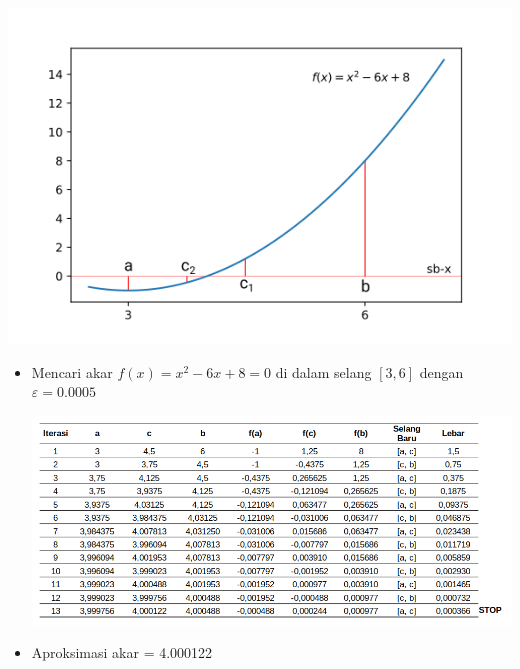 \documentclass[pdflatex,compress]{beamer}
\begin{document}
\begin{frame}
	\begin{center}
		\includegraphics[width=\linewidth]{img/img002}
	\end{center}
\end{frame}

\begin{frame}
	\begin{itemize}
		\item Mencari akar $ f(x) = x^2 - 6x + 8 = 0 $ di dalam selang $ [3, 6] $ dengan $ \varepsilon = 0.0005 $
		
		\begin{center}
			\includegraphics[width=\linewidth]{img/tab001}
		\end{center}
	
		\item Aproksimasi akar = 4.000122
	\end{itemize}
\end{frame}
\end{document}
